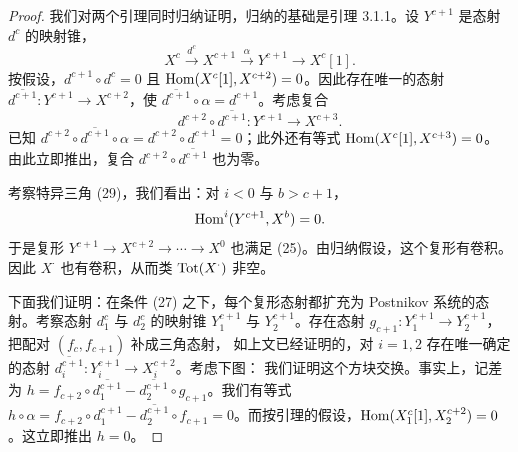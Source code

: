 \begin{proof}
我们对两个引理同时归纳证明，归纳的基础是引理 3.1.1。设 $Y^{c+1}$ 是态射 $d^{c}$ 的映射锥，
\begin{equation}
X^{c}\xrightarrow{d^{c}}X^{c+1}\xrightarrow{\alpha}Y^{c+1}\longrightarrow X^{c}[1].
\tag{29}
\end{equation}
按假设，$d^{c+1}\circ d^{c}=0$ 且 $\operatorname{Hom}(X^{c}[1],X^{c+2})=0$。因此存在唯一的态射 $\overline{d^{c+1}}:Y^{c+1}\to X^{c+2}$，使 $\overline{d^{c+1}}\circ\alpha=d^{c+1}$。考虑复合
\begin{equation*}
d^{c+2}\circ\overline{d^{c+1}}:Y^{c+1}\longrightarrow X^{c+3}.
\end{equation*}
已知 $d^{c+2}\circ\overline{d^{c+1}}\circ\alpha=d^{c+2}\circ d^{c+1}=0$；此外还有等式 $\operatorname{Hom}(X^{c}[1],X^{c+3})=0$。由此立即推出，复合 $d^{c+2}\circ\overline{d^{c+1}}$ 也为零。


考察特异三角 (29)，我们看出：对 $i<0$ 与 $b>c+1$，
\begin{equation*}
\operatorname{Hom}^{i}(Y^{c+1},X^{b})=0.
\end{equation*}
于是复形 $Y^{c+1}\to X^{c+2}\to\cdots\to X^{0}$ 也满足 (25)。由归纳假设，这个复形有卷积。因此 $X^{\cdot}$ 也有卷积，从而类 $\operatorname{Tot}(X^{\cdot})$ 非空。

下面我们证明：在条件 (27) 之下，每个复形态射都扩充为 Postnikov 系统的态射。考察态射 $d_{1}^{c}$ 与 $d_{2}^{c}$ 的映射锥 $Y_{1}^{c+1}$ 与 $Y_{2}^{c+1}$。存在态射 $g_{c+1}:Y_{1}^{c+1}\to Y_{2}^{c+1}$，把配对 $(f_{c},f_{c+1})$ 补成三角态射，
如上文已经证明的，对 $i=1,2$ 存在唯一确定的态射 $\overline{d_{i}^{c+1}}:Y_{i}^{c+1}\to X_{i}^{c+2}$。考虑下图：
我们证明这个方块交换。事实上，记差为 $h=f_{c+2}\circ\overline{d_{1}^{c+1}}-\overline{d_{2}^{c+1}}\circ g_{c+1}$。我们有等式 $h\circ\alpha=f_{c+2}\circ d_{1}^{c+1}-\overline{d_{2}^{c+1}}\circ f_{c+1}=0$。而按引理的假设，$\operatorname{Hom}(X_{1}^{c}[1],X_{2}^{c+2})=0$。这立即推出 $h=0$。


\end{proof}
